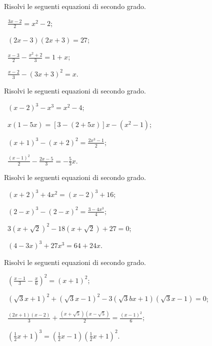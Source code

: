 \begin{esercizio}[\Ast]
 \label{ese:3.20}
Risolvi le seguenti equazioni di secondo grado.
\begin{multicols}{2}
 \begin{enumeratea}
 \item~$\frac{3 x-2}{2} = x^{2}-2$;
 \item~$(2 x-3) (2 x + 3) = 27$;
 \item~$\frac{x-3}{2}-\frac{x^{2} + 2}{3} = 1 + x$;
 \item~$\frac{x-2}{3}-(3 x + 3)^{2} = x$.
 \end{enumeratea}
 \end{multicols}
\end{esercizio}

\begin{esercizio}[\Ast]
 \label{ese:3.21}
Risolvi le seguenti equazioni di secondo grado.
\begin{multicols}{2}
 \begin{enumeratea}
 \item~$(x-2)^{3}-x^{3} = x^{2}-4$;
 \item~$x (1-5 x) = [ 3-(2 + 5 x) ] x-(x^{2}-1)$;
 \item~$(x + 1)^{3}-(x + 2)^{2} = \frac{2 x^{3}-1}{2}$;
 \item~$\frac{(x-1)^{2}}{2}-\frac{2 x-5}{3} =-\frac{5}{3} x$.
 \end{enumeratea}
 \end{multicols}
\end{esercizio}

\begin{esercizio}[\Ast]
 \label{ese:3.22}
Risolvi le seguenti equazioni di secondo grado.
\begin{multicols}{2}
 \begin{enumeratea}
 \item~$(x + 2)^{3} + 4 x^{2} = (x-2)^{3} + 16$;
 \item~$(2-x)^{3}-(2-x)^{2} = \frac{3-4 x^{3}}{4}$;
 \item~$3 \left(x + \sqrt{2} \right)^{2}-18 \left(x + \sqrt{2}\right) + 27 = 0$;
 \item~$(4-3 x)^{3} + 27 x^{3} = 64 + 24 x$.
 \end{enumeratea}
 \end{multicols}
\end{esercizio}

\begin{esercizio}[\Ast]
 \label{ese:3.23}
Risolvi le seguenti equazioni di secondo grado.
 \begin{enumeratea}
 \item~$\left(\frac{x-1}{3}-\frac{x}{6} \right)^{2} = (x + 1)^{2}$;
 \item~$(\sqrt{3} x + 1)^{2} + (\sqrt{3} x-1)^{2}-3 (\sqrt{3} b x + 1) (\sqrt{3} x-1) = 0$;
 \item~$\frac{(2 x + 1) (x-2)}{3} + \frac{(x + \sqrt{5}) (x -\sqrt{5})}{2} = \frac{(x-1)^{2}}{6}$;
 \item~$\left(\frac{1}{2} x + 1 \right)^{3} = \left(\frac{1}{2} x-1\right) \left(\frac{1}{2} x + 1 \right)^{2}$.
 \end{enumeratea}
\end{esercizio}


